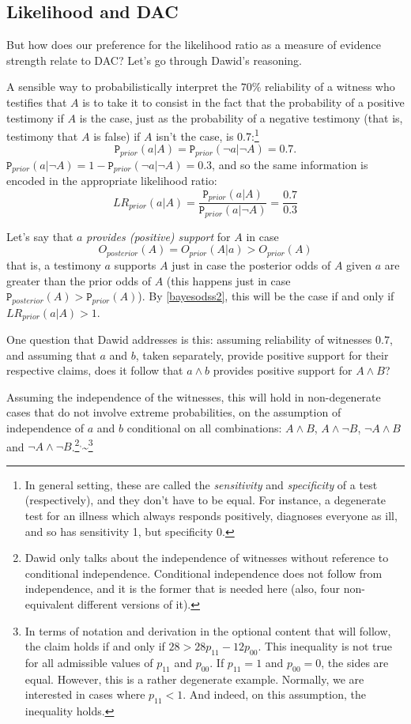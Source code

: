 \documentclass[10pt,dvipsnames,enabledeprecatedfontcommands]{scrartcl}
\newcommand{\n}{\neg}
\newcommand{\et}{\wedge}
\newcommand{\prr}[1]{\mbox{$\mathtt{P}_{prior}(#1)$}}
\newcommand{\prp}[1]{\mbox{$\mathtt{P}_{posterior}(#1)$}}
\begin{document}
\hypertarget{likelihood-and-dac}{%
\subsection{Likelihood and DAC}\label{likelihood-and-dac}}

But how does our preference for the likelihood ratio as a measure of
evidence strength relate to DAC? Let's go through Dawid's reasoning.

A sensible way to probabilistically interpret the \(70\%\) reliability
of a witness who testifies that \(A\) is to take it to consist in the
fact that the probability of a positive testimony if \(A\) is the case,
just as the probability of a negative testimony (that is, testimony that
\(A\) is false) if \(A\) isn't the case, is
0.7:\footnote{In general setting, these are called the \emph{sensitivity} and \emph{specificity} of a test (respectively), and they don't have to be equal. For instance, a degenerate test for an illness which always responds positively, diagnoses everyone as ill, and so has sensitivity 1, but specificity 0.}
\[\prr{a\vert A}=\prr{\n a\vert\n  A}=0.7.\]
\noindent   \(\prr{a\vert \n A}=1- \prr{\n a\vert \n A}=0.3\), and so
the same information is encoded in the appropriate likelihood ratio:
\[LR_{prior}(a\vert A )=\frac{\prr{a\vert A}}{\prr{a\vert \n A}}= \frac{0.7}{0.3}\]

Let's say that \(a\) \emph{provides (positive) support} for \(A\) in
case \[O_{posterior}(A)=O_{prior}(A\vert a)> O_{prior}(A)\]
\noindent  that is, a testimony \(a\) supports \(A\) just in case the
posterior odds of \(A\) given \(a\) are greater than the prior odds of
\(A\) (this happens just in case \(\prp{A}>\prr{A}\)). By
\eqref{bayesodss2}, this will be the case if and only if
\(LR_{prior}(a\vert A)>1\).

One question that Dawid addresses is this: assuming reliability of
witnesses \(0.7\), and assuming that \(a\) and \(b\), taken separately,
provide positive support for their respective claims, does it follow
that \(a \et b\) provides positive support for \(A\et B\)?

Assuming the independence of the witnesses, this will hold in
non-degenerate cases that do not involve extreme probabilities, on the
assumption of independence of \(a\) and \(b\) conditional on all
combinations: \(A\et B\), \(A\et \n B\), \(\n A \et B\) and
\(\n A \et \n B\).\footnote{Dawid only talks about the independence of witnesses without reference to  conditional independence. Conditional independence does not follow from independence, and it is the former that is needed here (also, four non-equivalent different versions of it).}\(^,\)\textasciitilde{}\footnote{In terms of notation and derivation in the optional content that will follow, the claim holds  if and only if $28 > 28 p_{11}-12p_{00}$.  This inequality is not  true for all admissible values of $p_{11}$ and $p_{00}$. If $p_{11}=1$ and $p_{00}=0$, the sides are equal. However, this is a rather degenerate example. Normally, we are  interested in cases where $p_{11}< 1$. And indeed, on this assumption, the inequality holds.}
\end{document}
